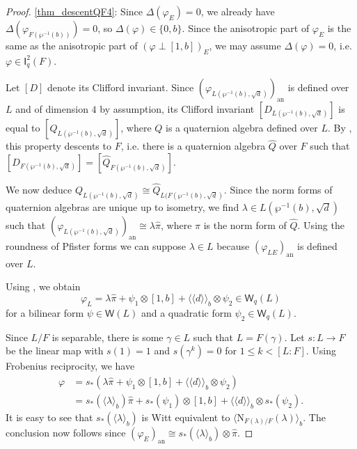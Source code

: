 \documentclass{amsart}
\numberwithin{equation}{section}
\newcommand{\an}{\mathrm{an}} %
\newcommand{\bif}[1]{\langle #1 \rangle_b}
\newcommand{\bipf}[1]{\langle\!\langle #1\rangle\!\rangle_b}
\newcommand{\norm}{\mathrm{N}}
\newcommand{\I}{\mathsf{I}}
\newcommand{\W}{\mathsf{W}}
\begin{document}
\begin{proof}
    \ref{thm_descentQF4}:
    Since $\Delta(\varphi_E) = 0$, we already have $\Delta(\varphi_{F(\wp^{-1}(b))}) = 0$, so $\Delta(\varphi) \in \{0, b\}$.
    Since the anisotropic part of $\varphi_E$ is the same as the anisotropic part of $(\varphi \perp [1, b])_E$, we may assume $\Delta(\varphi) = 0$, i.e. $\varphi \in \I^2_q(F)$.
    
    Let $[D]$ denote its Clifford invariant.
    Since $(\varphi_{L(\wp^{-1}(b), \sqrt d)})_\an$ is defined over $L$ and of dimension $4$ by assumption, its Clifford invariant $[D_{L(\wp^{-1}(b), \sqrt d)}]$ is equal to $[Q_{L(\wp^{-1}(b), \sqrt d)}]$, where $Q$ is a quaternion algebra defined over $L$.
    By , this property descents to $F$, i.e. there is a quaternion algebra $\widehat Q$ over $F$ such that $[D_{F(\wp^{-1}(b), \sqrt d)}] = [\widehat Q_{F(\wp^{-1}(b), \sqrt d)}]$.
    
    We now deduce $Q_{L(\wp^{-1}(b), \sqrt d)} \cong \widehat Q_{L(F(\wp^{-1}(b), \sqrt d)}$.
    Since the norm forms of quaternion algebras are unique up to isometry, we find $\lambda \in L(\wp^{-1}(b), \sqrt d)$ such that $(\varphi_{L(\wp^{-1}(b), \sqrt d)})_\an \cong \lambda\widehat \pi$, where $\widehat\pi$ is the norm form of $\widehat Q$.
    Using the roundness of Pfister forms we can suppose $\lambda \in L$ because $(\varphi_{LE})_\an$ is defined over $L$.
    
    Using \cite[Theorem 2.1 (ii)]{Ahmad04}, we obtain 
    \[\varphi_L = \lambda\widehat\pi + \psi_1\otimes [1, b] + \bipf{d} \otimes \psi_2 \in \W_q(L)\]
    for a bilinear form $\psi \in \W(L)$ and a quadratic form $\psi_2 \in \W_q(L)$.
    
    Since $L / F$ is separable, there is some $\gamma \in L$ such that $L = F(\gamma)$.     
    Let $s: L \to F$ be the linear map with $s(1) = 1$ and $s(\gamma^k) = 0$ for $1 \leq k < [L : F]$.
    Using Frobenius reciprocity, we have
    \begin{align*}
        \varphi &= s_\ast(\lambda\widehat\pi + \psi_1\otimes [1, b] + \bipf{d} \otimes \psi_2)\\
        &= s_\ast(\bif{\lambda})\widehat\pi + s_\ast(\psi_1)\otimes [1, b] + \bipf{d}\otimes s_\ast(\psi_2).
    \end{align*}
    It is easy to see that $s_\ast(\bif{\lambda})$ is Witt equivalent to $\bif{\norm_{F(\lambda) / F}(\lambda)}$.
    The conclusion now follows since $(\varphi_{E})_\an \cong s_\ast(\bif{\lambda}) \otimes \widehat\pi$.
    

\end{proof}
\end{document}
